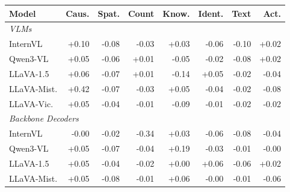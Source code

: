 \begin{table}[h]
\centering
\small
\setlength{\tabcolsep}{3.5pt}

\begin{tabular}{lrrrrrrr}
\toprule
\textbf{Model} & \textbf{Caus.} & \textbf{Spat.} & \textbf{Count} & \textbf{Know.} & \textbf{Ident.} & \textbf{Text} & \textbf{Act.} \\
\midrule
\multicolumn{8}{l}{\textit{VLMs}} \\
InternVL & \cellcolor{blue!13}+0.10 & \cellcolor{red!10}-0.08 & \cellcolor{red!10}-0.03 & \cellcolor{blue!10}+0.03 & \cellcolor{red!10}-0.06 & \cellcolor{red!12}-0.10 & \cellcolor{blue!10}+0.02 \\
Qwen3-VL & \cellcolor{blue!10}+0.05 & \cellcolor{red!10}-0.06 & \cellcolor{gray!10}+0.01 & \cellcolor{red!10}-0.05 & \cellcolor{red!10}-0.02 & \cellcolor{red!10}-0.08 & \cellcolor{blue!10}+0.02 \\
LLaVA-1.5 & \cellcolor{blue!10}+0.06 & \cellcolor{red!10}-0.07 & \cellcolor{gray!10}+0.01 & \cellcolor{red!18}-0.14 & \cellcolor{blue!10}+0.05 & \cellcolor{red!10}-0.02 & \cellcolor{red!10}-0.04 \\
LLaVA-Mist. & \cellcolor{blue!40}+0.42 & \cellcolor{red!10}-0.07 & \cellcolor{red!10}-0.03 & \cellcolor{blue!10}+0.05 & \cellcolor{red!10}-0.04 & \cellcolor{red!10}-0.02 & \cellcolor{red!11}-0.08 \\
LLaVA-Vic. & \cellcolor{blue!10}+0.05 & \cellcolor{red!10}-0.04 & \cellcolor{gray!10}-0.01 & \cellcolor{red!11}-0.09 & \cellcolor{gray!10}-0.01 & \cellcolor{gray!10}-0.02 & \cellcolor{gray!10}-0.02 \\
\midrule
\multicolumn{8}{l}{\textit{Backbone Decoders}} \\
InternVL & \cellcolor{gray!10}-0.00 & \cellcolor{red!10}-0.02 & \cellcolor{red!40}-0.34 & \cellcolor{blue!10}+0.03 & \cellcolor{red!10}-0.06 & \cellcolor{red!10}-0.08 & \cellcolor{red!10}-0.04 \\
Qwen3-VL & \cellcolor{blue!10}+0.05 & \cellcolor{red!10}-0.07 & \cellcolor{red!10}-0.04 & \cellcolor{blue!25}+0.19 & \cellcolor{red!10}-0.03 & \cellcolor{gray!10}-0.01 & \cellcolor{gray!10}-0.00 \\
LLaVA-1.5 & \cellcolor{blue!10}+0.05 & \cellcolor{red!10}-0.04 & \cellcolor{gray!10}-0.02 & \cellcolor{gray!10}+0.00 & \cellcolor{blue!10}+0.06 & \cellcolor{red!10}-0.06 & \cellcolor{blue!10}+0.02 \\
LLaVA-Mist. & \cellcolor{blue!10}+0.05 & \cellcolor{red!10}-0.08 & \cellcolor{gray!10}-0.01 & \cellcolor{blue!10}+0.06 & \cellcolor{gray!10}-0.00 & \cellcolor{gray!10}-0.01 & \cellcolor{red!10}-0.06 \\

\end{tabular}
\end{table}
